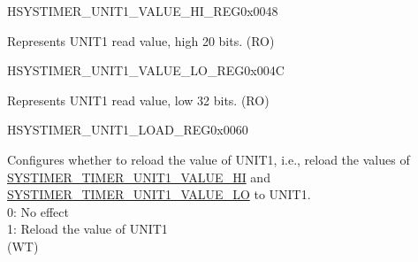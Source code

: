 \begin{register}{H}{SYSTIMER\_UNIT1\_VALUE\_HI\_REG}{0x0048}\label{regdesc:SYSTIMERUNIT1VALUEHIREG}
%
%
\regnewline%
\begin{regdesc}\begin{reglist}
\label{fielddesc:SYSTIMERTIMERUNIT1VALUEHI}\item [SYSTIMER\_TIMER\_UNIT1\_VALUE\_HI] Represents UNIT1 read value, high 20 bits. (RO)
\end{reglist}\end{regdesc}
\end{register}


\begin{register}{H}{SYSTIMER\_UNIT1\_VALUE\_LO\_REG}{0x004C}\label{regdesc:SYSTIMERUNIT1VALUELOREG}
%
\regnewline%
\begin{regdesc}\begin{reglist}
\label{fielddesc:SYSTIMERTIMERUNIT1VALUELO}\item [SYSTIMER\_TIMER\_UNIT1\_VALUE\_LO] Represents UNIT1 read value, low 32 bits. (RO)
\end{reglist}\end{regdesc}
\end{register}


\begin{register}{H}{SYSTIMER\_UNIT1\_LOAD\_REG}{0x0060}\label{regdesc:SYSTIMERUNIT1LOADREG}
%
%
\regnewline%
\begin{regdesc}\begin{reglist}
\label{fielddesc:SYSTIMERTIMERUNIT1LOAD}\item [SYSTIMER\_TIMER\_UNIT1\_LOAD] Configures whether to reload the value of UNIT1, i.e., reload the values of \hyperref[fielddesc:SYSTIMERTIMERUNIT0VALUEHI]{SYSTIMER\_TIMER\_UNIT1\_VALUE\_HI} and \hyperref[fielddesc:SYSTIMERTIMERUNIT0VALUELO]{SYSTIMER\_TIMER\_UNIT1\_VALUE\_LO} to UNIT1. \\
0: No effect \\
1: Reload the value of UNIT1\\
(WT)
\end{reglist}\end{regdesc}
\end{register}


